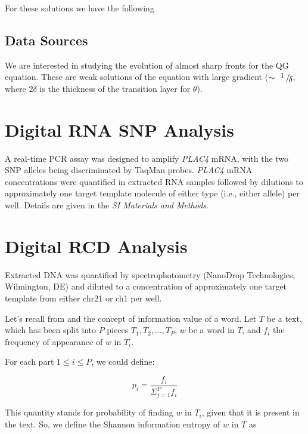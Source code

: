 \documentclass{pnastwo}
\begin{document}
\begin{article}
For these solutions we have the following


\subsection{Data Sources}
We are interested in studying the evolution of almost sharp fronts
for the QG equation. These are weak solutions of the equation with
large gradient ($\sim \displaystyle{ \inlinefrac{1}{\delta}}$, where $2
\delta$ is the thickness of the transition layer for $\theta$).



\begin{materials}
\section{Digital RNA SNP Analysis} A real-time PCR assay was designed
to amplify {\it PLAC4} mRNA, with the two SNP alleles being discriminated
by TaqMan probes. {\it PLAC4} mRNA concentrations were quantified in
extracted RNA samples followed by dilutions to approximately one target
template molecule of either type (i.e., either allele) per well.
Details are given in the {\it SI Materials and Methods}.

\section{Digital RCD Analysis} Extracted DNA was quantified by
spectrophotometry (NanoDrop Technologies, Wilmington, DE) and diluted to a
concentration of 
approximately one target template from either chr21 or ch1 per well.
\end{materials}


Let's recall from \cite{DARWIN} and \cite{ENTROPIC} the concept of information value of a word. 
Let $T$ be a text, which has been split into $P$ pieces $T_1, T_2, \dots, T_P$, $w$ be a word in $T$,
and $f_i$ the frequency of appearance of $w$ in $T_i$.

For each part $1 \leq i \leq P$, we could define:

\begin{equation}
  p_i = \frac{f_i}{\Sigma_{j=1}^{P}f_i}
\end{equation}

This quantity stands for probability of finding $w$ in $T_i$, given that it is present in the text. So, 
we define the Shannon information entropy of $w$ in $T$ as


\end{article}
\end{document}
